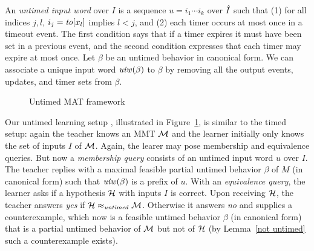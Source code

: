 An \emph{untimed input word} over $I$ is a sequence $u = i_1 \cdots i_k$ over $\hat{I}$ such that (1)
for all indices $j, l$, $i_j = \mathit{to}[x_l]$ implies $l < j$, and (2) each timer occurs at most once in a timeout event.
The first condition  says that if a timer expires it must have been set in a previous event, and the second condition  expresses that
each timer may expire at most once.
Let $\beta$ be an untimed behavior in canonical form.
We can associate a unique input word $\mathit{uiw}(\beta)$ to $\beta$ by removing all the output events,
updates, and timer sets from $\beta$.
\iflong
\begin{figure}
\begin{center}
\end{center}    
\caption{Untimed MAT framework}
\label{fig:untimed MAT}
\end{figure}
\fi

Our untimed learning setup
\iflong
, illustrated in Figure~\ref{fig:untimed MAT}, 
\fi
is similar to the timed setup:
again the teacher knows an MMT ${\mathcal M}$ and the learner initially only knows the set of inputs $I$ of ${\mathcal M}$.
Again, the learer may pose membership and equivalence queries.
But now a \emph{membership query} consists of an untimed input word $u$ over $I$.
The teacher replies with a maximal feasible partial untimed behavior $\beta$ of $M$ (in canonical form) such that
$\mathit{uiw}(\beta)$ is a prefix of $u$.
With an \emph{equivalence query}, the learner asks if a hypothesis ${\mathcal H}$ with inputs $I$ is correct.
Upon receiving ${\mathcal H}$, the teacher answers \emph{yes} if ${\mathcal H} \approx_{\mathit{untimed}} {\mathcal M}$.
Otherwise it answers \emph{no} and supplies a counterexample, which now is a feasible untimed behavior $\beta$ (in canonical form) that
is a partial untimed behavior of ${\mathcal M}$ but not of ${\mathcal H}$ (by Lemma~\ref{not untimed} such a counterexample exists).

